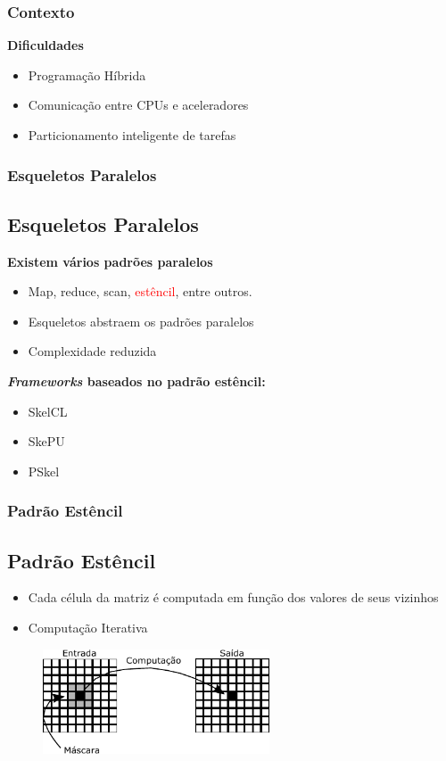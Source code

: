\documentclass[xcolor={table}]{beamer}
\newcommand{\Fws}{\textit{Frameworks}\xspace}
\begin{document}
\begin{frame}\frametitle{Contexto}
    \textbf{Dificuldades}
    \begin{itemize}
        \item {Programação Híbrida}
        \item {Comunicação entre CPUs e aceleradores}
        \item {Particionamento inteligente de tarefas}
    \end{itemize}
    \vfill
\end{frame}

\begin{frame}\frametitle{Esqueletos Paralelos}
    \subsection{Esqueletos Paralelos}
    \textbf{Existem vários padrões paralelos ~\cite{mccool10}}
    \begin{itemize}
        \item {Map, reduce, scan, \textcolor{red}{estêncil}, entre outros.}
    \end{itemize}
    \begin{itemize}
        \item{Esqueletos abstraem os padrões paralelos}
        \item{Complexidade reduzida}
    \end{itemize}
    \textbf{\Fws baseados no padrão estêncil:}
    \begin{itemize}
        \item SkelCL ~\cite{steuwer11}
        \item SkePU ~\cite{enmyren10}
        \item PSkel ~\cite{pereira15}
    \end{itemize}
\end{frame}


\begin{frame}\frametitle{Padrão Estêncil}
    \subsection{Padrão Estêncil}
    \begin{itemize}
        \item {Cada célula da matriz é computada em função dos valores de 			seus vizinhos}
        \item {Computação Iterativa}
    \end{itemize}
    \begin{figure}
        \includegraphics[width=0.6\textwidth]{26}
    \end{figure}
\end{frame}
\end{document}
